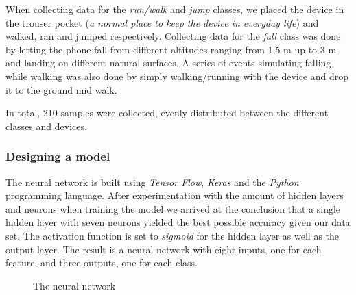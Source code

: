 \documentclass[12pt, a4paper, onecolumn]{article}
\begin{document}
		When collecting data for the \textit{run/walk} and \textit{jump} classes, we placed the device in the trouser pocket (\textit{a normal place to keep the device in everyday life}) and walked, ran and jumped respectively. Collecting data for the \textit{fall} class was done by letting the phone fall from different altitudes ranging from 1,5 m up to 3 m and landing on different natural surfaces. A series of events simulating falling while walking was also done by simply walking/running with the device and drop it to the ground mid walk.
		
		In total, 210 samples were collected, evenly distributed between the different classes and devices.

		\subsubsection{Designing a model}
			The neural network is built using \textit{Tensor Flow}, \textit{Keras} and the \textit{Python} programming language. After experimentation with the amount of hidden layers and neurons when training the model we arrived at the conclusion that a single hidden layer with seven neurons yielded the best possible accuracy given our data set. The activation function is set to \textit{sigmoid} for the hidden layer as well as the output layer. The result is a neural network with eight inputs, one for each feature, and three outputs, one for each class. 
			
			\begin{figure}[H]
				\centering
				\caption{The neural network}%
				\label{fig:neural-network}%
			\end{figure}
\end{document}
